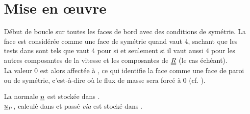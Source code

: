 %
% 
%
% 
% 
% 
%
%

\section{Mise en \oe uvre}
\label{Base_Clsyvt_prg_meo}%
D\'ebut de boucle sur toutes les faces de bord  avec des conditions de
sym\'etrie. La face est consid\'er\'ee comme une face de sym\'etrie quand 
 vaut 4, sachant que les tests dans 
sont tels que  vaut 4 pour  si et seulement si il vaut aussi 
4 pour les autres composantes de la vitesse et les composantes de $\underline{\underline{R}}$ (le 
cas \'ech\'eant).\\
La valeur 0 est alors affect\'ee \`a , ce qui identifie la face
comme une face de paroi ou de sym\'etrie, c'est-\`a-dire o\`u le flux de masse
sera forc\'e \`a 0 (cf. ).

La normale $\underline{n}$ est stock\'ee dans .\\
$\underline{u}_{I'}$, calcul\'e dans  et pass\'e {\em via} 
est stock\'e dans . 

